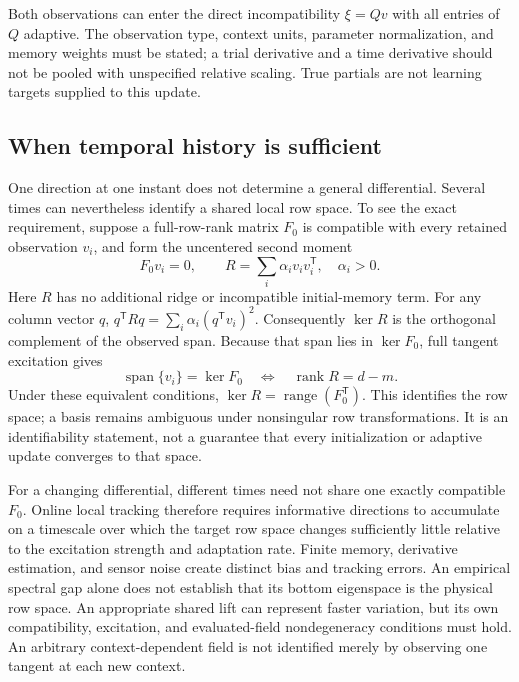 Both observations can enter the direct incompatibility $\xi=Qv$ with all
entries of $Q$ adaptive. The observation type, context units, parameter
normalization, and memory weights must be stated; a trial derivative and a
time derivative should not be pooled with unspecified relative scaling.
True partials are not learning targets supplied to this update.

\subsection{When temporal history is sufficient}
One direction at one instant does not determine a general differential.
Several times can nevertheless identify a shared local row space. To see
the exact requirement, suppose a full-row-rank matrix $F_0$ is compatible
with every retained observation $v_i$, and form the uncentered second moment
\begin{equation}
 F_0v_i=0,\qquad
 R=\sum_i\alpha_i v_iv_i^{\mathsf T},\quad \alpha_i>0.
 \label{eq:tv_covariance}
\end{equation}
Here $R$ has no additional ridge or incompatible initial-memory term.
For any column vector $q$,
$q^{\mathsf T}Rq=\sum_i\alpha_i(q^{\mathsf T}v_i)^2$.
Consequently $\ker R$ is the orthogonal complement of the observed span.
Because that span lies in $\ker F_0$, full tangent excitation gives
\begin{equation}
 \operatorname{span}\{v_i\}=\ker F_0
 \quad\Longleftrightarrow\quad \operatorname{rank}R=d-m.
 \label{eq:tv_identification}
\end{equation}
Under these equivalent conditions,
$\ker R=\operatorname{range}(F_0^{\mathsf T})$.
This identifies the row space; a basis remains ambiguous under nonsingular
row transformations. It is an identifiability statement, not a guarantee
that every initialization or adaptive update converges to that space.

For a changing differential, different times need not share one exactly
compatible $F_0$. Online local tracking therefore requires informative
directions to accumulate on a timescale over which the target row space
changes sufficiently little relative to the excitation strength and adaptation
rate. Finite memory, derivative estimation, and sensor noise create distinct
bias and tracking errors. An empirical spectral gap alone does not establish
that its bottom eigenspace is the physical row space. An appropriate shared
lift can represent faster variation, but its own compatibility, excitation,
and evaluated-field nondegeneracy conditions must hold. An arbitrary
context-dependent field is not identified merely by observing one tangent
at each new context.

